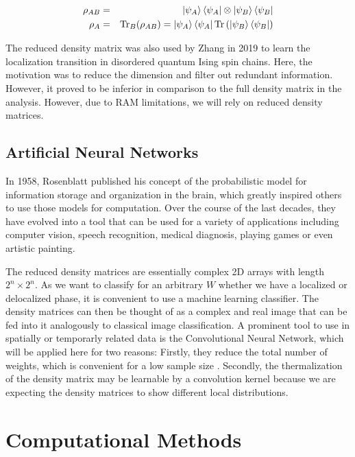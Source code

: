 \documentclass[reprint,amsmath,amssymb,aps,prb]{revtex4-2}
\begin{document}
\begin{eqnarray}
\rho_{AB}&=&\ket{\psi_A}\bra{\psi_A}\otimes\ket{\psi_B}\bra{\psi_B}\\
\rho_A&=&\text{Tr}_B(\rho_{AB})=\ket{\psi_A}\bra{\psi_A}\text{Tr}\left(\ket{\psi_B}\bra{\psi_B}\right)\label{red_density}
\end{eqnarray}%

The reduced density matrix was also used by Zhang in 2019 to learn the localization transition in disordered quantum Ising spin chains. Here, the motivation was to reduce the dimension and filter out redundant information. However, it proved to be inferior in comparison to the full density matrix in the analysis.\cite{Zhang2019} However, due to RAM limitations, we will rely on reduced density matrices.


\subsection{Artificial Neural Networks}

In 1958, Rosenblatt published his concept of the probabilistic model for information storage and organization in the brain, which greatly inspired others to use those models for computation.\cite{Rosenblatt1958} Over the course of the last decades, they have evolved into a tool that can be used for a variety of applications including computer vision, speech recognition, medical diagnosis, playing games or even artistic painting.\cite{Gatys2015}

The reduced density matrices are essentially complex 2D arrays with length $2^n\times2^n$. As we want to classify for an arbitrary $W$ whether we have a localized or delocalized phase, it is convenient to use a machine learning classifier. The density matrices can then be thought of as a complex and real image that can be fed into it analogously to classical image classification. A prominent tool to use in spatially or temporarly related data is the Convolutional Neural Network, which will be applied here for two reasons: Firstly, they reduce the total number of weights, which is convenient for a low sample size \cite{Schmidhuber2015}. Secondly, the thermalization of the density matrix may be learnable by a convolution kernel because we are expecting the density matrices to show different local distributions.


\section{Computational Methods}
\end{document}
